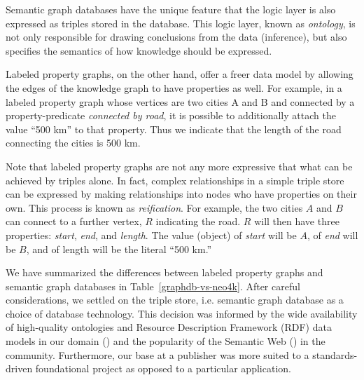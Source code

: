 Semantic graph databases have the unique feature that the logic layer is also expressed as triples stored in the database. This logic layer, known as \emph{ontology}, is not only responsible for drawing conclusions from the data (inference), but also specifies the semantics of how knowledge should be expressed.

Labeled property graphs, on the other hand, offer a freer data model by allowing the edges of the knowledge graph to have properties as well. For example, in a labeled property graph whose vertices are two cities A and B and connected by a property-predicate \emph{connected by road}, it is possible to additionally attach the value ``500 km'' to that property. Thus we indicate that the length of the road connecting the cities is 500 km.

Note that labeled property graphs are not any more expressive that what can be achieved by triples alone. In fact, complex relationships in a simple triple store can be expressed by making relationships into nodes who have properties on their own. This process is known as \emph{reification}. For example, the two cities $A$ and $B$ can connect to a further vertex, $R$ indicating the road. $R$ will then have three properties: \emph{start}, \emph{end}, and \emph{length}. The value (object) of \emph{start} will be $A$, of \emph{end} will be $B$, and of length will be the literal ``500 km.''

We have summarized the differences between labeled property graphs and semantic graph databases in Table~\ref{graphdb-vs-neo4k}. After careful considerations, we settled on the triple store, i.e. semantic graph database as a choice of database technology. This decision was informed by the wide availability of high-quality ontologies and Resource Description Framework (RDF) data models in our domain (\cite{baskauf_darwin-sw:_2016,peroni_semantic_2014}) and the popularity of the Semantic Web (\cite{berners-lee_semantic_2001}) in the community. Furthermore, our base at a publisher was more suited to a standards-driven foundational project as opposed to a particular application.

